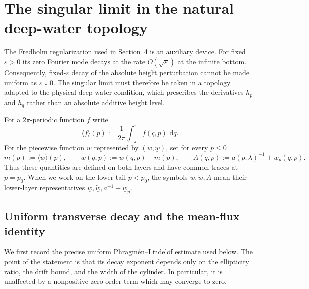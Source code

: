 \documentclass[11pt,reqno]{amsart}
\numberwithin{equation}{section}
\newcommand{\dd}{\,\mathrm{d}}
\theoremstyle{definition}
\theoremstyle{remark}
\begin{document}
\section{The singular limit in the natural deep-water topology}
\label{sec:singular-dw}

The Fredholm regularization used in Section~4 is an auxiliary device.
For fixed $\varepsilon>0$ its zero Fourier mode decays at the rate
$O(\sqrt\varepsilon)$ at the infinite bottom.  Consequently, fixed-$\varepsilon$
decay of the absolute height perturbation cannot be made uniform as
$\varepsilon\downarrow0$.  The singular limit must therefore be taken in a
topology adapted to the physical deep-water condition, which prescribes the
derivatives $h_p$ and $h_q$ rather than an absolute additive height level.

For a $2\pi$-periodic function $f$ write
\[
 \langle f\rangle(p):=\frac1{2\pi}\int_{-\pi}^{\pi}f(q,p)\,\dd q.
\]
For the piecewise function $w$ represented by
$(\overline w,\underline w)$, set for every $p\le0$
\[
 m(p):=\langle w\rangle(p),\qquad
 \widetilde w(q,p):=w(q,p)-m(p),\qquad
 A(q,p):=a(p;\lambda)^{-1}+w_p(q,p).
\]
Thus these quantities are defined on both layers and have common traces
at $p=p_0$.  When we work on the lower tail $p<p_0$, the symbols
$w,\widetilde w,A$ mean their lower-layer representatives
$\underline w,\underline{\widetilde w},a^{-1}+\underline w_p$.

\subsection{Uniform transverse decay and the mean-flux identity}

We first record the precise uniform Phragm\'en--Lindel\"of estimate
used below.  The point of the statement is that its decay exponent
depends only on the ellipticity ratio, the drift bound, and the width
of the cylinder.  In particular, it is unaffected by a nonpositive
zero-order term which may converge to zero.
\end{document}

